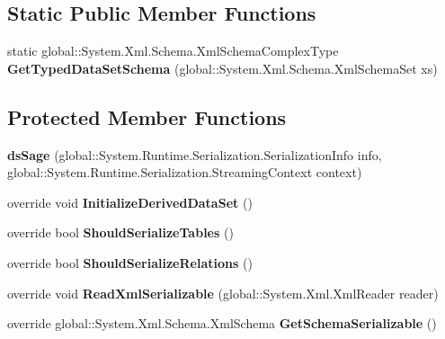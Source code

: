 \subsection*{Static Public Member Functions}
\begin{DoxyCompactItemize}
\item 
static global\+::\+System.\+Xml.\+Schema.\+Xml\+Schema\+Complex\+Type {\bfseries Get\+Typed\+Data\+Set\+Schema} (global\+::\+System.\+Xml.\+Schema.\+Xml\+Schema\+Set xs)\hypertarget{class_products_1_1_data_1_1ds_sage_a6451858ced5e266e3dc9c27ac8519802}{}\label{class_products_1_1_data_1_1ds_sage_a6451858ced5e266e3dc9c27ac8519802}

\end{DoxyCompactItemize}
\subsection*{Protected Member Functions}
\begin{DoxyCompactItemize}
\item 
{\bfseries ds\+Sage} (global\+::\+System.\+Runtime.\+Serialization.\+Serialization\+Info info, global\+::\+System.\+Runtime.\+Serialization.\+Streaming\+Context context)\hypertarget{class_products_1_1_data_1_1ds_sage_a5112041c9ba22c6ea28c88192bec4c03}{}\label{class_products_1_1_data_1_1ds_sage_a5112041c9ba22c6ea28c88192bec4c03}

\item 
override void {\bfseries Initialize\+Derived\+Data\+Set} ()\hypertarget{class_products_1_1_data_1_1ds_sage_a1808a62e3aad097ecf52b341f0126b66}{}\label{class_products_1_1_data_1_1ds_sage_a1808a62e3aad097ecf52b341f0126b66}

\item 
override bool {\bfseries Should\+Serialize\+Tables} ()\hypertarget{class_products_1_1_data_1_1ds_sage_ae01c7ea5dcb5a5a4534da39ff6d0b7fd}{}\label{class_products_1_1_data_1_1ds_sage_ae01c7ea5dcb5a5a4534da39ff6d0b7fd}

\item 
override bool {\bfseries Should\+Serialize\+Relations} ()\hypertarget{class_products_1_1_data_1_1ds_sage_a98e09f58c8bb56ce6bd5b64a2786e6e4}{}\label{class_products_1_1_data_1_1ds_sage_a98e09f58c8bb56ce6bd5b64a2786e6e4}

\item 
override void {\bfseries Read\+Xml\+Serializable} (global\+::\+System.\+Xml.\+Xml\+Reader reader)\hypertarget{class_products_1_1_data_1_1ds_sage_a1b1eec4d9dffa766c273ed9f3f6f09e6}{}\label{class_products_1_1_data_1_1ds_sage_a1b1eec4d9dffa766c273ed9f3f6f09e6}

\item 
override global\+::\+System.\+Xml.\+Schema.\+Xml\+Schema {\bfseries Get\+Schema\+Serializable} ()\hypertarget{class_products_1_1_data_1_1ds_sage_ab3ca6641b7e05d4666819171ea98d70b}{}\label{class_products_1_1_data_1_1ds_sage_ab3ca6641b7e05d4666819171ea98d70b}

\end{DoxyCompactItemize}
